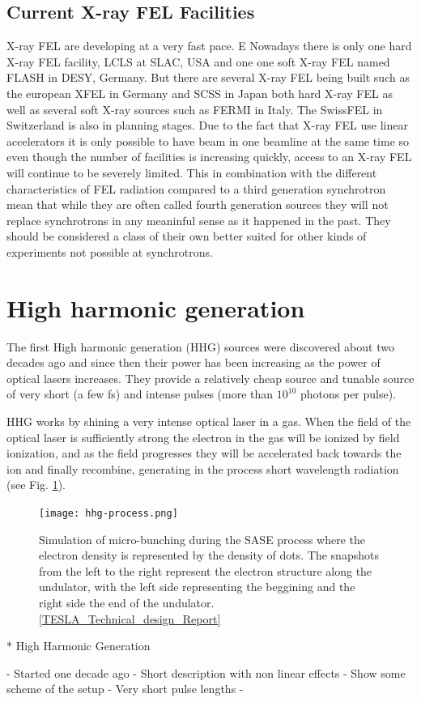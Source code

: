 \subsection{Current X-ray FEL Facilities}

X-ray FEL are developing at a very fast pace. E
Nowadays there is only one hard X-ray FEL facility, LCLS at SLAC, USA and one
one soft X-ray FEL named FLASH in DESY, Germany. But there are several X-ray FEL
being built such as the european XFEL in Germany and SCSS
in Japan both hard X-ray FEL as well as several soft X-ray sources such as FERMI
in Italy. The SwissFEL in Switzerland is also in planning stages. 
Due to the fact that X-ray FEL use linear accelerators it is only
possible to have beam in one beamline at the same time so even though the number
of facilities is increasing quickly, access to an X-ray FEL will continue to be
severely limited. This in combination with the different characteristics of FEL
radiation compared to a third generation synchrotron mean that while they are
often called fourth generation sources they will not replace synchrotrons in any
meaninful sense as it happened in the past. They should be considered a class of
their own better suited for other kinds of experiments not possible at synchrotrons.

\section{High harmonic generation}

The first High harmonic generation (HHG) sources were discovered about two decades ago
and since then their power has been increasing as the power of optical lasers
increases. They provide a relatively cheap source and tunable source of very
short (a few fs) and intense pulses (more than $10^{10}$ photons per pulse). 

HHG works by shining a very intense optical laser in a gas. When the field of
the optical laser is sufficiently strong the electron in the gas will be ionized
by field ionization, and as the field progresses they will be accelerated back
towards the ion and finally recombine, generating in the process short
wavelength radiation (see Fig. \ref{Fig:HHG_Process}).

\begin{figure}[h]
\centering
  \texttt{[image: hhg-process.png]}
  \caption{Simulation of micro-bunching during the SASE process where the
    electron density is represented by the density of dots. The snapshots
    from the left to the right represent the electron structure along the
    undulator, with the left side representing the beggining and the right side
    the end of the undulator. \ref{TESLA_Technical_design_Report}}
  \label{Fig:HHG_Process}
\end{figure}

* High Harmonic Generation

- Started one decade ago
- Short description with non linear effects
- Show some scheme of the setup
- Very short pulse lengths
- 
